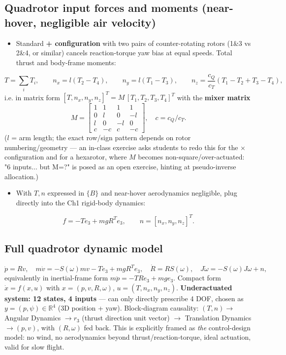 \documentclass[11pt]{article}
\begin{document}
\subsection{Quadrotor input forces and moments (near-hover, negligible air velocity)}
\begin{itemize}
\item Standard \textbf{+ configuration} with two pairs of counter-rotating rotors (1\&3 vs 2\&4, or similar) cancels reaction-torque yaw bias at equal speeds. Total thrust and body-frame moments:
\end{itemize}
\[T=\sum_iT_i,\qquad n_x=l(T_2-T_4),\qquad n_y=l(T_1-T_3),\qquad n_z=\frac{c_Q}{c_T}(T_1-T_2+T_3-T_4),\]
i.e. in matrix form $[T,n_x,n_y,n_z]^T = M\,[T_1,T_2,T_3,T_4]^T$ with the \textbf{mixer matrix}
\[M=\begin{bmatrix}1&1&1&1\\0&l&0&-l\\l&0&-l&0\\c&-c&c&-c\end{bmatrix},\quad c=c_Q/c_T.\]
($l$ = arm length; the exact row/sign pattern depends on rotor numbering/geometry — an in-class exercise asks students to redo this for the × configuration and for a hexarotor, where $M$ becomes non-square/over-actuated: "6 inputs... but M=?" is posed as an open exercise, hinting at pseudo-inverse allocation.)
\begin{itemize}
\item With $T,n$ expressed in $\{B\}$ and near-hover aerodynamics negligible, plug directly into the Ch1 rigid-body dynamics:
\end{itemize}
\[f = -Te_3+mgR^Te_3,\qquad n=[n_x,n_y,n_z]^T.\]

\subsection{Full quadrotor dynamic model}
\[
\dot p = Rv,\quad m\dot v = -S(\omega)mv - Te_3+mgR^Te_3,\quad \dot R=RS(\omega),\quad J\dot\omega=-S(\omega)J\omega+n,
\]
equivalently in inertial-frame form $m\ddot p = -TRe_3+mge_3$.
Compact form $\dot x=f(x,u)$ with $x=(p,v,R,\omega)$, $u=(T,n_x,n_y,n_z)$.
\textbf{Underactuated system: 12 states, 4 inputs} — can only directly prescribe 4 DOF, chosen as $y=(p,\psi)\in\mathbb{R}^4$ (3D position + yaw). Block-diagram causality: $(T,n)\to$ Angular Dynamics $\to r_3$ (thrust direction unit vector) $\to$ Translation Dynamics $\to (p,v)$, with $(R,\omega)$ fed back.
This is explicitly framed as \textit{the} control-design model: no wind, no aerodynamics beyond thrust/reaction-torque, ideal actuation, valid for slow flight.
\end{document}
